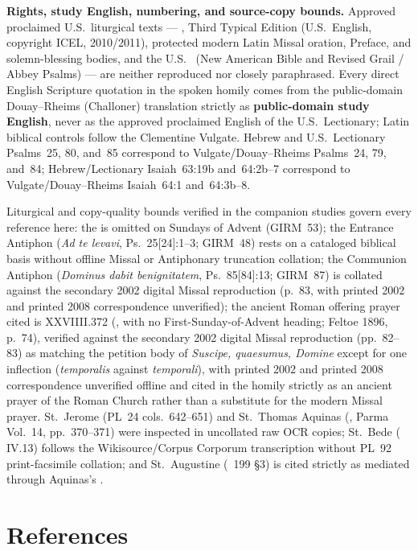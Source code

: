 \medskip
\noindent\textbf{Rights, study English, numbering, and source-copy bounds.}
Approved proclaimed U.S.\ liturgical texts --- , Third Typical Edition (U.S.\ English, copyright ICEL, 2010/2011), protected modern Latin Missal oration, Preface, and solemn-blessing bodies, and the U.S.\  (New American Bible and Revised Grail / Abbey Psalms) --- are neither reproduced nor closely paraphrased. Every direct English Scripture quotation in the spoken homily comes from the public-domain Douay--Rheims (Challoner) translation strictly as \textbf{public-domain study English}, never as the approved proclaimed English of the U.S.\ Lectionary; Latin biblical controls follow the Clementine Vulgate. Hebrew and U.S.\ Lectionary Psalms~25, 80, and~85 correspond to Vulgate/Douay--Rheims Psalms~24, 79, and~84; Hebrew/Lectionary Isaiah~63:19b and~64:2b--7 correspond to Vulgate/Douay--Rheims Isaiah~64:1 and~64:3b--8.

Liturgical and copy-quality bounds verified in the companion studies govern every reference here: the  is omitted on Sundays of Advent (GIRM~53); the Entrance Antiphon (\emph{Ad te levavi}, Ps.~25[24]:1--3; GIRM~48) rests on a cataloged biblical basis without offline Missal or Antiphonary truncation collation; the Communion Antiphon (\emph{Dominus dabit benignitatem}, Ps.~85[84]:13; GIRM~87) is collated against the secondary 2002 digital Missal reproduction (p.~83, with printed 2002 and printed 2008 correspondence unverified); the ancient Roman offering prayer cited is  XXVIIII.372 (, with no First-Sunday-of-Advent heading; Feltoe 1896, p.~74), verified against the secondary 2002 digital Missal reproduction (pp.~82--83) as matching the petition body of \emph{Suscipe, quaesumus, Domine} except for one inflection (\emph{temporalis} against \emph{temporali}), with printed 2002 and printed 2008 correspondence unverified offline and cited in the homily strictly as an ancient prayer of the Roman Church rather than a substitute for the modern Missal prayer. St.~Jerome (PL~24 cols.~642--651) and St.~Thomas Aquinas (, Parma Vol.~14, pp.~370--371) were inspected in uncollated raw OCR copies; St.~Bede ( IV.13) follows the Wikisource/Corpus Corporum transcription without PL~92 print-facsimile collation; and St.~Augustine (~199 §3) is cited strictly as mediated through Aquinas's .

\section*{References}

